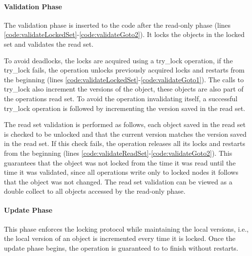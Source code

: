 \paragraph{Validation Phase} 
The validation phase is inserted to the code after
the read-only phase (lines
\ref{code:validateLockedSet}-\ref{code:validateGoto2}). 
It locks the objects in the locked set and validates the read set. 

To avoid deadlocks, the locks are acquired using a try\_lock
operation, if the try\_lock fails, the operation unlocks 
previously acquired locks and restarts from the beginning 
(lines \ref{code:validateLockedSet}-\ref{code:validateGoto1}). 
The calls to try\_lock also increment the versions 
of the object,  these objects are also part of the 
operations read set. 
To avoid the operation invalidating itself, 
a successful try\_lock operation is followed by incrementing
the version saved in the read set.  

The read set validation is performed as follows, 
each object saved in the read set is checked to be unlocked 
and that the current version matches the version saved in the 
read set. If this check fails, the operation releases all its
locks and restarts from the beginning
(lines \ref{code:validateReadSet}-\ref{code:validateGoto2}). 
This guarantees
that the object was not locked from the time it was read until
the time it was validated, since all operations write only to
locked nodes it follows that the object was not changed.  
The read set validation can be viewed as a double collect 
to all objects accessed by the read-only phase. 


  
\paragraph{Update Phase} 
This phase enforces the locking protocol
  while maintaining the local versions, i.e., the local version of 
  an object is incremented every time it is locked.  
  Once the update phase begins, the operation is guaranteed to to 
  finish without restarts.  


 

